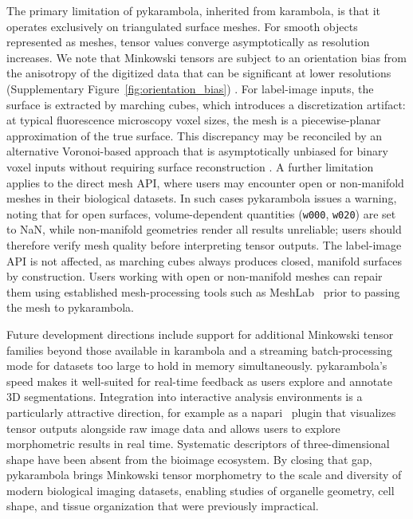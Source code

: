 \documentclass[times, twoside, watermark]{zHenriquesLab-StyleBioRxiv}
\newcommand{\newtxt}[1]{#1}
\newcommand{\added}[2][]{#2}        %
\newcommand{\deleted}[2][]{}        %
\newcommand{\replaced}[3][]{#2}     %
\newcommand{\newtxt}[1]{\textcolor{chgadded}{#1}}
\renewcommand{\added}[2][]{\newtxt{#2}}  %
\begin{document}
The primary limitation of pykarambola, inherited from karambola, is that it operates exclusively on triangulated surface meshes.
\replaced{For smooth objects represented as meshes, tensor values converge asymptotically as resolution increases.
We note that Minkowski tensors are subject to an orientation bias from the anisotropy of the digitized data that can be significant at lower resolutions (Supplementary Figure~\ref{fig:orientation_bias}) \cite{Svane2017}.}
{For label-image inputs, the surface is extracted by marching cubes, which introduces a discretization artifact: at typical fluorescence microscopy voxel sizes, the mesh is a piecewise-planar approximation of the true surface. For smooth objects, tensor values converge asymptotically as voxel resolution increases, but rank-2 surface tensors are subject to an orientation bias from the anisotropy of the digital grid that can be significant at typical fluorescence microscopy resolutions \cite{Svane2017};}
\added{For label-image inputs, the surface is extracted by marching cubes, which introduces a discretization artifact: at typical fluorescence microscopy voxel sizes, the mesh is a piecewise-planar approximation of the true surface.}
\replaced{This discrepancy may be reconciled by an}{An} alternative Voronoi-based approach that is asymptotically unbiased for binary voxel inputs without requiring surface reconstruction \deleted{has recently been proposed} \cite{Hug2025}.
A further limitation applies to the direct mesh API, where users may encounter open or non-manifold meshes in their biological datasets.
In such cases pykarambola issues a warning, noting that for open surfaces, volume-dependent quantities (\texttt{w000}, \texttt{w020}) are set to NaN, while non-manifold geometries render all results unreliable; users should therefore verify mesh quality before interpreting tensor outputs.
The label-image API is not affected, as marching cubes always produces closed, manifold surfaces by construction.
\newtxt{Users working with open or non-manifold meshes can repair them using established mesh-processing tools such as MeshLab~\cite{Cignoni2008meshlab} prior to passing the mesh to pykarambola.}

Future development directions include support for additional Minkowski tensor families beyond those available in karambola and a streaming batch-processing mode for datasets too large to hold in memory simultaneously.
pykarambola's speed makes it well-suited for real-time feedback as users explore and annotate 3D segmentations.
Integration into interactive analysis environments is a particularly attractive direction, for example as a napari~\cite{Sofroniew2026napari} plugin that visualizes tensor outputs alongside raw image data and allows users to explore morphometric results in real time.
Systematic descriptors of three-dimensional shape have been absent from the bioimage ecosystem. By closing that gap, pykarambola brings Minkowski tensor morphometry to the scale and diversity of modern biological imaging datasets, enabling studies of organelle geometry, cell shape, and tissue organization that were previously impractical.
\end{document}
